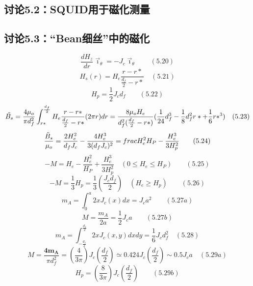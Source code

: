 \subsection{讨论5.2：SQUID用于磁化测量}




\subsection{讨论5.3：“Bean细丝”中的磁化}

\begin{equation}%
\frac{dH_{z}}{dr}\vec{\imath}_{\theta}=-J_{c}\vec{\imath}_{\theta}\qquad(5.20)
\end{equation}
\begin{equation}%
H_{s}(r)=H_{e}\frac{r-r*}{\frac{d_{f}}{2}-r*}\quad(5.21)
\end{equation}
\begin{equation}%
H_{p}=\frac{1}{2}J_{c}d_{f}\qquad(5.22)
\end{equation}
\begin{equation}%
\tilde{B_{s}}=\frac{4\mu_{o}}{\pi d_{f}^{2}}\int_{r*}^{\frac{d_{f}}{2}}H_{e}\frac{r-r*}{\frac{d_{f}}{2}-r*}(2\pi r)dr\\
=\frac{8\mu_{o}H_{e}}{d_{f}^{2}(\frac{d_{f}}{2}-r*)}(\frac{1}{24}d_{f}^{3}-\frac{1}{8}d_{f}^{2}r*+\frac{1}{6}r*^{3})\quad(5.23)
\end{equation}
\begin{equation}%
\frac{\tilde{B}_{s}}{\mu_{o}}=\frac{2H^{2}_{e}}{d_{f}J_{c}}-\frac{4H^{3}_{e}}{3(d_{f}J_{c})^{2}}=\\frac{H^{2}_{e}}{H_{P}}-\frac{H_{e}^{3}}{3H^{2}_{p}}\qquad(5.24)
\end{equation}
\begin{equation}%
-M=H_{e}-\frac{H^{2}_{e}}{H_{P}}+\frac{H^{3}_{e}}{3H^{2}_{p}}\quad(0\leq H_{e}\leq H_{P})\qquad(5.25)
\end{equation}
\begin{equation}%
-M=\frac{1}{3}H_{p}=\frac{1}{3}(\frac{J_{c}d_{f}}{2})\quad(H_{e}\geq H_{p})\qquad(5.26)
\end{equation}
\begin{equation}%
m_{A}=\int_{0}^{a}2xJ_{c}(x)dx=J_{c}a^{2}\qquad(5.27a)
\end{equation}
\begin{equation}%
M=\frac{m_{A}}{2a}=\frac{1}{2}J_{c}a\qquad(5.27b)
\end{equation}
\begin{equation}%
m_{A}=\int_{-\frac{d_{f}}{2}}^{\frac{d_{f}}{2}}2xJ_{c}(x,y)dxdy=\frac{1}{6}J_{c}d_{f}^{2}\quad(5.28)
\end{equation}
\begin{equation}%
M=\frac{\mathbf{4m_{A}}}{\pi d_{f}^{2}}=(\frac{4}{3\pi})J_{c}(\frac{d_{f}}{2})\simeq0.424J_{c}(\frac{d_{f}}{2})\sim0.5J_{c}a\quad(5.29a)
\end{equation}
\begin{equation}%
H_{p}=(\frac{8}{3\pi})J_{c}(\frac{d_{f}}{2})\qquad(5.29b)
\end{equation}


